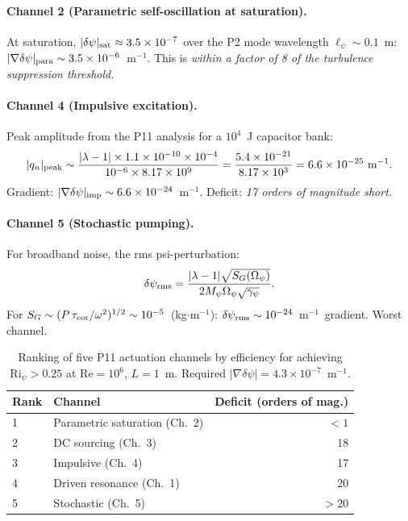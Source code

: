 \documentclass[11pt,twocolumn]{article}
\newcommand{\dpsi}{\delta\psi}
\newcommand{\lam}{\lambda}
\newcommand{\Opsi}{\Omega_\psi}
\newcommand{\gpsi}{\gamma_\psi}
\newcommand{\Mpsi}{M_\psi}
\newcommand{\Rey}{\mathrm{Re}}
\newcommand{\Ri}{\mathrm{Ri}}
\begin{document}
\paragraph{Channel 2 (Parametric self-oscillation at saturation).}
At saturation, $|\dpsi|_{\rm sat} \approx 3.5\times10^{-7}$ over
the P2 mode wavelength $\ell_\psi \sim 0.1$~m:
$|\nabla\dpsi|_{\rm para} \sim 3.5\times10^{-6}$~m$^{-1}$.
This is \emph{within a factor of 8 of the turbulence suppression threshold.}

\paragraph{Channel 4 (Impulsive excitation).}
Peak amplitude from the P11 analysis for a $10^4$~J capacitor bank:
\begin{equation}
|q_n|_{\rm peak} \sim \frac{|\lam-1|\times1.1\times10^{-10}\times10^{-4}}
{10^{-6}\times8.17\times10^9}
= \frac{5.4\times10^{-21}}{8.17\times10^3}
= 6.6\times10^{-25}~\text{m}^{-1}.
\end{equation}
Gradient: $|\nabla\dpsi|_{\rm imp} \sim 6.6\times10^{-24}$~m$^{-1}$.
Deficit: \emph{17 orders of magnitude short.}

\paragraph{Channel 5 (Stochastic pumping).}
For broadband noise, the rms psi-perturbation:
\begin{equation}
\delta\psi_{\rm rms} = \frac{|\lam-1|\sqrt{S_G(\Opsi)}}
{2\Mpsi\Opsi\sqrt{\gpsi}}.
\end{equation}
For $S_G \sim (P\,\tau_{\rm cor}/\omega^2)^{1/2} \sim 10^{-5}$~(kg$\cdot$m$^{-1}$):
$\delta\psi_{\rm rms} \sim 10^{-24}$~m$^{-1}$~gradient.
Worst channel.

\begin{table}[h]
\caption{Ranking of five P11 actuation channels by efficiency for achieving
$\Ri_\psi > 0.25$ at $\Rey = 10^6$, $L = 1$~m.
Required $|\nabla\dpsi| = 4.3\times10^{-7}$~m$^{-1}$.}
\label{tab:channel_rank}
\begin{tabular}{llr}
\toprule
Rank & Channel & Deficit (orders of mag.) \\
\midrule
1 & Parametric saturation (Ch.~2) & $<1$ \\
2 & DC sourcing (Ch.~3) & 18 \\
3 & Impulsive (Ch.~4) & 17 \\
4 & Driven resonance (Ch.~1) & 20 \\
5 & Stochastic (Ch.~5) & $>20$ \\
\bottomrule
\end{tabular}
\end{table}
\end{document}
